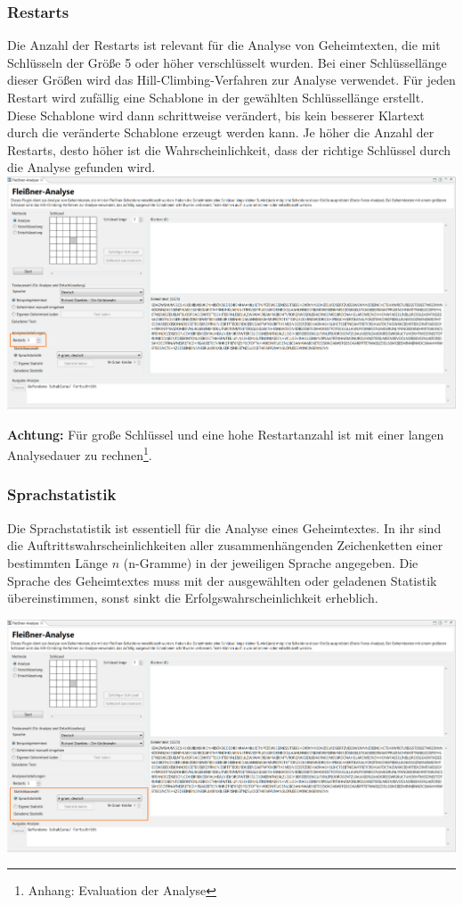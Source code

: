 \documentclass[fontsize=12pt, DIV=15, parskip=half-]{scrartcl}
\theoremstyle{break}
\begin{document}
\subsubsection{Restarts}
Die Anzahl der Restarts ist relevant für die Analyse von Geheimtexten, die mit Schlüsseln der Größe 5 oder höher verschlüsselt wurden. Bei einer Schlüssellänge dieser Größen wird das \glqq Hill-Climbing\grqq -Verfahren zur Analyse verwendet. Für jeden Restart wird zufällig eine Schablone in der gewählten Schlüssellänge erstellt. Diese Schablone wird dann schrittweise verändert, bis kein besserer Klartext durch die veränderte Schablone erzeugt werden kann. Je höher die Anzahl der Restarts, desto höher ist die Wahrscheinlichkeit, dass der richtige Schlüssel durch die Analyse gefunden wird.
\includegraphics[scale=0.45]{FleissnerRestarts.png}

\textbf{Achtung:} Für große Schlüssel und eine hohe Restartanzahl ist mit einer langen Analysedauer zu rechnen\footnote{Anhang: Evaluation der Analyse}.

\subsubsection{Sprachstatistik}
Die Sprachstatistik ist essentiell für die Analyse eines Geheimtextes. In ihr sind die Auftrittswahrscheinlichkeiten aller zusammenhängenden Zeichenketten einer bestimmten Länge $n$ (n-Gramme) in der jeweiligen Sprache angegeben. Die Sprache des Geheimtextes muss mit der ausgewählten oder geladenen Statistik übereinstimmen, sonst sinkt die Erfolgswahrscheinlichkeit erheblich.

\includegraphics[scale=0.45]{FleissnerStatistics.png}
\end{document}
